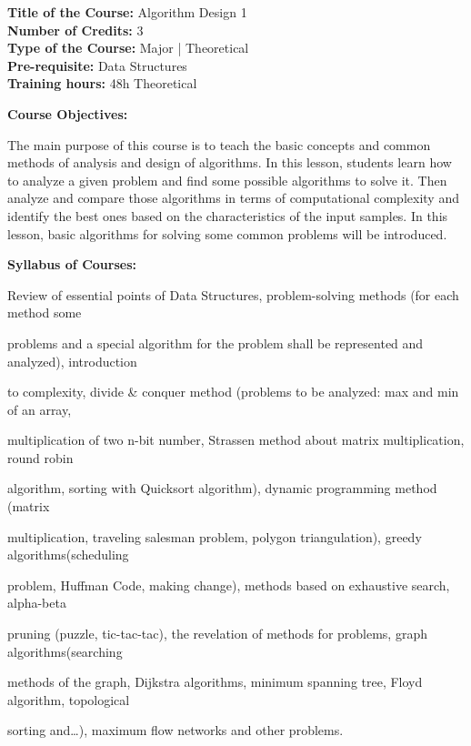 \documentclass[12pt,a4paper]{article}
\begin{document}
\newpage
\textbf{Title of the Course:} Algorithm Design 1\\
\textbf{Number of Credits:} 3\\
\textbf{Type of the Course:} Major | Theoretical\\
\textbf{Pre-requisite:} Data Structures\\
\textbf{Training hours:} 48h Theoretical\par\vspace{4pt}
\textbf{Course Objectives:}\par\vspace{2pt}
The main purpose of this course is to teach the basic concepts and common methods of analysis
and design of algorithms. In this lesson, students learn how to analyze a given problem and find
some possible algorithms to solve it. Then analyze and compare those algorithms in terms of
computational complexity and identify the best ones based on the characteristics of the input
samples. In this lesson, basic algorithms for solving some common problems will be introduced.\par\vspace{4pt}
\textbf{Syllabus of Courses:}\par\vspace{2pt}
Review of essential points of Data Structures, problem-solving methods (for each method some\par
problems and a special algorithm for the problem shall be represented and analyzed), introduction\par
to complexity, divide \& conquer method (problems to be analyzed: max and min of an array,\par
multiplication of two n-bit number, Strassen method about matrix multiplication, round robin\par
algorithm, sorting with Quicksort algorithm), dynamic programming method (matrix\par
multiplication, traveling salesman problem, polygon triangulation), greedy algorithms(scheduling\par
problem, Huffman Code, making change), methods based on exhaustive search, alpha-beta\par
pruning (puzzle, tic-tac-tac), the revelation of methods for problems, graph algorithms(searching\par
methods of the graph, Dijkstra algorithms, minimum spanning tree, Floyd algorithm, topological\par
sorting and…), maximum flow networks and other problems.\par\vspace{4pt}
\end{document}
